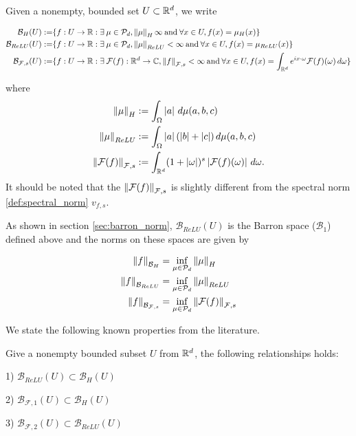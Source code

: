 Given a nonempty, bounded set $U \subset \mathbb{R}^d$, we write

\begin{align*}
    \mathcal{B}_{H}(U) :=
    & \{f: U \to \mathbb{R}: \exists\: \mu \in \mathcal{P}_d, \left\| \mu \right\|_H \infty 
    \:\text{and}\: \forall x \in U, f(x) = \mu_{H}(x) \} \\
    \mathcal{B}_{ReLU}(U) :=
    & \{f: U \to \mathbb{R}: \exists\: \mu \in \mathcal{P}_d, \left\| \mu \right\|_{ReLU} < \infty
    \:\text{and}\: \forall x \in U, f(x) = \mu_{ReLU}(x) \} \\
    \mathcal{B}_{\mathcal{F},s}(U) :=
    & \{f: U \to \mathbb{R}: \exists\: \mathcal{F}(f): \mathbb{R}^d \to \mathbb{C}, \left\| f \right\|_{\mathcal{F}, s} < \infty 
    \:\text{and}\: \forall x \in U, 
    f(x) = \int_{\mathbb{R}^d} e^{ix \cdot \omega} \mathcal{F}(f)(\omega) \,d\omega \} \\
\end{align*}

where
\begin{align*}
    \left\| \mu \right\|_H      &:= \int_{\Omega} \left| a \right|\,d\mu(a,b,c) \\
    \left\| \mu \right\|_{ReLU} &:= \int_{\Omega} \left| a \right| (\left| b \right| + \left| c \right|)\,d\mu(a,b,c) \\
    \left\| \mathcal{F}(f) \right\|_{\mathcal{F},s} 
                      &:= \int_{\mathbb{R}^d} (1 + \left| \omega \right|)^s \left| \mathcal{F}(f)(\omega) \right|\,d\omega.
\end{align*}
It should be noted that the $\left\| \mathcal{F}(f) \right\|_{\mathcal{F},s}$ is slightly
different from the spectral norm \eqref{def:spectral_norm} $v_{f,s}$.

As shown in section \ref{sec:barron_norm}, $\mathcal{B}_{ReLU}(U)$ is the Barron
space ($\mathcal{B}_1$) defined above and the norms on these spaces are given by 

\begin{align*}
    \left\| f \right\|_{\mathcal{B}_H} 
        &= \inf_{\mu \in \mathcal{P}_d} \left\| \mu \right\|_{H} \\
    \left\| f \right\|_{\mathcal{B}_{ReLU}} 
        &= \inf_{\mu \in \mathcal{P}_d} \left\| \mu \right\|_{ReLU} \\
    \left\| f \right\|_{\mathcal{B}_{\mathcal{F}, s}} 
        &= \inf_{\mu \in \mathcal{P}_d} \left\| \mathcal{F}(f) \right\|_{\mathcal{F},s}
\end{align*}

We state the following known properties from the literature.

\begin{lemma}
    Give a nonempty bounded subset $U$ from $\mathbb{R}^d$, the following relationships holds:

    1) $\mathcal{B}_{ReLU}(U) \subset \mathcal{B}_{H}(U)$

    2) $\mathcal{B}_{\mathcal{F}, 1}(U) \subset \mathcal{B}_H(U)$

    3) $\mathcal{B}_{\mathcal{F}, 2}(U) \subset \mathcal{B}_{ReLU}(U)$
\end{lemma}


